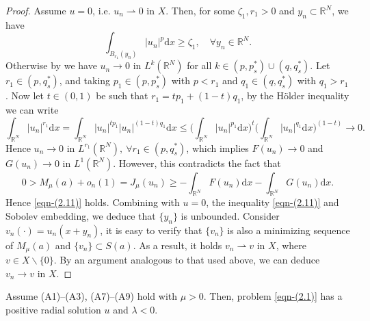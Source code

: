 \documentclass[reqno]{amsart}
\begin{document}
\begin{proof}
Assume $u=0$, i.e. $u_n\rightharpoonup 0$ in $X$.
Then, for some $\zeta_1,r_1>0$ and ${y_n}\subset\mathbb{R}^N$, we have
\begin{equation}\label{eqn-(2.11)}
\int_{B_{r_1}(y_n)}|u_n|^{p}\mathrm{d}x\ge\zeta_1, \quad \forall y_n\in\mathbb{R}^N.
\end{equation}
Otherwise by \cite[Lemma 2.1]{ref1} we have $u_n\to0$ in 
$L^{k}(\mathbb{R}^N)$ for all $k\in(p,p_{s}^{*})\cup (q,q_{s}^{*})$. 
Let $r_1\in (p, q_{s}^{*})$, and taking $p_1\in(p,p_{s}^{*})$ with $p<r_1$ and 
$q_1\in(q,q_{s}^{*})$ with $q_1>r_1$. Now let $t\in(0,1)$ be such that 
$r_1=tp_1+(1-t)q_1$, by the H\"{o}lder inequality we can write
$$
\int_{\mathbb{R}^N}|u_n|^{r_1}\mathrm{d}x
 =\int_{\mathbb{R}^N}|u_n|^{tp_1}|u_n|^{(1-t)q_1}\mathrm{d}x
 \le\Big(\int_{\mathbb{R}^N}|u_n|^{p_1}\mathrm{d}x\Big)^{t}
 \Big(\int_{\mathbb{R}^N}|u_n|^{q_1}\mathrm{d}x\Big)^{(1-t)}\to 0.
$$
Hence $u_n\to 0$ in $L^{r_1}(\mathbb{R}^N),~\forall r_1\in(p,q_{s}^{*})$,
which implies $F(u_n)\to 0$ and $G(u_n)\to 0$ in $L^{1}(\mathbb{R}^N)$.
However, this contradicts the fact that 
$$
0>M_\mu(a)+o_n(1)=J_\mu(u_n)\ge-\int_{\mathbb{R}^N}F(u_n)\mathrm{d}x
-\int_{\mathbb{R}^N}G(u_n)\mathrm{d}x.
$$
Hence \eqref{eqn-(2.11)} holds. Combining with $u=0$, the inequality \eqref{eqn-(2.11)} 
and Sobolev embedding, we deduce that $\{y_n\}$ is unbounded. 
Consider $v_n (\cdot)=u_n(x+y_n)$, it is easy to verify that $\{v_n\}$ is also 
a minimizing sequence of $M_\mu(a)$ and $\{v_n\}\subset S(a)$. As a result, 
it holds $v_n\rightharpoonup v$ in $X$, where $v\in X\backslash \{0\}$.
By an argument analogous to that used above, we can deduce $v_n\to v$ in $X$.
\end{proof}

\begin{lemma}\label{lem:2.5}
Assume {\rm (A1)--(A3), (A7)--(A9)} hold with $\mu>0$. 
Then, problem \eqref{eqn-(2.1)} has a positive radial solution $u$ and $\lambda<0$.
\end{lemma}
\end{document}
